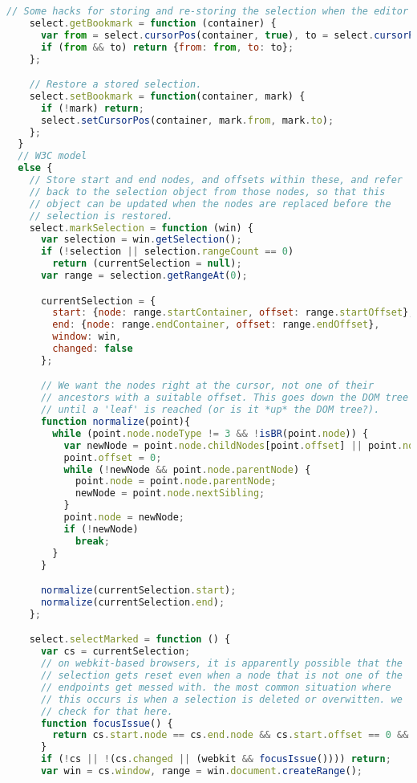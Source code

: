 \begin{lstlisting}[language=Javascript]
    // Some hacks for storing and re-storing the selection when the editor loses and regains focus.
    select.getBookmark = function (container) {
      var from = select.cursorPos(container, true), to = select.cursorPos(container, false);
      if (from && to) return {from: from, to: to};
    };

    // Restore a stored selection.
    select.setBookmark = function(container, mark) {
      if (!mark) return;
      select.setCursorPos(container, mark.from, mark.to);
    };
  }
  // W3C model
  else {
    // Store start and end nodes, and offsets within these, and refer
    // back to the selection object from those nodes, so that this
    // object can be updated when the nodes are replaced before the
    // selection is restored.
    select.markSelection = function (win) {
      var selection = win.getSelection();
      if (!selection || selection.rangeCount == 0)
        return (currentSelection = null);
      var range = selection.getRangeAt(0);

      currentSelection = {
        start: {node: range.startContainer, offset: range.startOffset},
        end: {node: range.endContainer, offset: range.endOffset},
        window: win,
        changed: false
      };

      // We want the nodes right at the cursor, not one of their
      // ancestors with a suitable offset. This goes down the DOM tree
      // until a 'leaf' is reached (or is it *up* the DOM tree?).
      function normalize(point){
        while (point.node.nodeType != 3 && !isBR(point.node)) {
          var newNode = point.node.childNodes[point.offset] || point.node.nextSibling;
          point.offset = 0;
          while (!newNode && point.node.parentNode) {
            point.node = point.node.parentNode;
            newNode = point.node.nextSibling;
          }
          point.node = newNode;
          if (!newNode)
            break;
        }
      }

      normalize(currentSelection.start);
      normalize(currentSelection.end);
    };

    select.selectMarked = function () {
      var cs = currentSelection;
      // on webkit-based browsers, it is apparently possible that the
      // selection gets reset even when a node that is not one of the
      // endpoints get messed with. the most common situation where
      // this occurs is when a selection is deleted or overwitten. we
      // check for that here.
      function focusIssue() {
        return cs.start.node == cs.end.node && cs.start.offset == 0 && cs.end.offset == 0;
      }
      if (!cs || !(cs.changed || (webkit && focusIssue()))) return;
      var win = cs.window, range = win.document.createRange();


\end{lstlisting}
